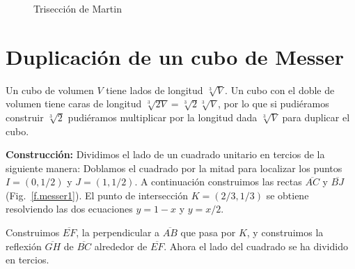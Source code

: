 \begin{figure}[t]
\begin{center}
\end{center}
\caption{Trisección de Martin}\label{f.martin}
\end{figure}

\section{Duplicación de un cubo de Messer}\label{s.messer}

Un cubo de volumen $V$ tiene lados de longitud $\sqrt[3]{V}$. Un cubo con el doble de volumen tiene caras de longitud $\sqrt[3]{2 V}=\sqrt[3]{2}\sqrt[3]{V}$, por lo que si pudiéramos construir $\sqrt[3]{2}$ pudiéramos multiplicar por la longitud dada $\sqrt[3]{V}$ para duplicar el cubo.

\noindent\textbf{Construcción:}
Dividimos el lado de un cuadrado unitario en tercios de la siguiente manera: Doblamos el cuadrado por la mitad para localizar los puntos $I=(0,1/2)$ y $J=(1,1/2)$. A continuación construimos las rectas $\overline{AC}$ y $\overline{BJ}$ (Fig.~\ref{f.messer1}). El punto de intersección $K=(2/3,1/3)$ se obtiene resolviendo las dos ecuaciones $y=1-x$ y $y=x/2$.

Construimos $\overline{EF}$, la perpendicular a $\overline{AB}$ que pasa por $K$, y construimos la reflexión $\overline{GH}$ de $\overline{BC}$ alrededor de $\overline{EF}$. Ahora el lado del cuadrado se ha dividido en tercios.

